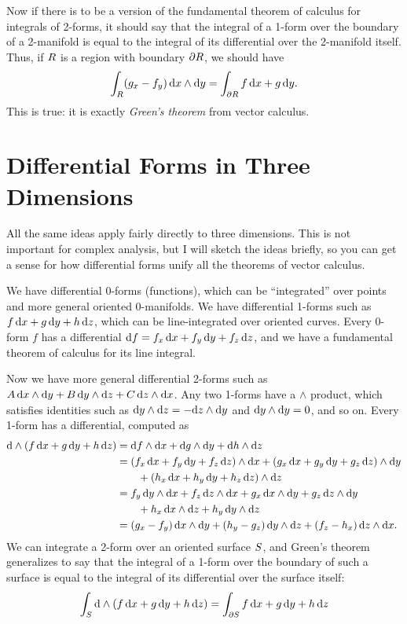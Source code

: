 \documentclass[12pt]{amsart}
\begin{document}
Now if there is to be a version of the fundamental theorem of calculus for integrals of 2-forms, it should say that the integral of a 1-form over the boundary of a 2-manifold is equal to the integral of its differential over the 2-manifold itself.
Thus, if $R$ is a region with boundary $\partial R$, we should have
\[ \int_{R} ({g}_{x} - {f}_{y})\, {\mathrm{d} x}\wedge{\ensuremath{\mathrm{d} y}} = \int_{\partial R} f\,{\mathrm{d} x} + g\,{\mathrm{d} y}. \]
This is true: it is exactly \emph{Green's theorem} from vector calculus.

\section{Differential Forms in Three Dimensions}
\label{sec:forms-in-3D}

All the same ideas apply fairly directly to three dimensions.
This is not important for complex analysis, but I will sketch the ideas briefly, so you can get a sense for how differential forms unify all the theorems of vector calculus.

We have differential 0-forms (functions), which can be ``integrated'' over points and more general oriented 0-manifolds.
We have differential 1-forms such as $f\,{\mathrm{d} x} + g\,{\mathrm{d} y} + h\,{\mathrm{d} z}$, which can be line-integrated over oriented curves.
Every 0-form $f$ has a differential ${\mathrm{d} f} = {f}_{x} \,{\mathrm{d} x} + {f}_{y}\,{\mathrm{d} y} + {f}_{z}\,{\mathrm{d} z}$, and we have a fundamental theorem of calculus for its line integral.

Now we have more general differential 2-forms such as $A\,{\mathrm{d} x}\wedge{\ensuremath{\mathrm{d} y}} + B\,{\mathrm{d} y}\wedge{\ensuremath{\mathrm{d} z}} + C \,{\mathrm{d} z}\wedge{\ensuremath{\mathrm{d} x}}$.
Any two 1-forms have a $\wedge$ product, which satisfies identities such as ${\mathrm{d} y}\wedge{\ensuremath{\mathrm{d} z}} = -{\mathrm{d} z}\wedge{\ensuremath{\mathrm{d} y}}$ and ${\mathrm{d} y}\wedge{\ensuremath{\mathrm{d} y}}=0$, and so on.
Every 1-form has a differential, computed as
\begin{align*}
  \mathrm{d}\wedge(f\,{\mathrm{d} x} + g\,{\mathrm{d} y} + h\,{\mathrm{d} z})
  &= {\mathrm{d} f}\wedge{\ensuremath{\mathrm{d} x}} + {\mathrm{d} g}\wedge{\ensuremath{\mathrm{d} y}} + {\mathrm{d} h}\wedge{\ensuremath{\mathrm{d} z}}\\
  &= ({f}_{x} \,{\mathrm{d} x} + {f}_{y} \,{\mathrm{d} y} + {f}_{z}\,{\mathrm{d} z})\wedge{\ensuremath{\mathrm{d} x}} + ({g}_{x} \,{\mathrm{d} x} + {g}_{y} \,{\mathrm{d} y} + {g}_{z}\,{\mathrm{d} z})\wedge{\ensuremath{\mathrm{d} y}}\\
  &\qquad + ({h}_{x} \,{\mathrm{d} x} + {h}_{y} \,{\mathrm{d} y} + {h}_{z}\,{\mathrm{d} z})\wedge{\ensuremath{\mathrm{d} z}}\\
  &= {f}_{y} \,{\mathrm{d} y}\wedge{\ensuremath{\mathrm{d} x}} + {f}_{z}\,{\mathrm{d} z}\wedge{\ensuremath{\mathrm{d} x}} + {g}_{x} \,{\mathrm{d} x}\wedge{\ensuremath{\mathrm{d} y}} + {g}_{z}\,{\mathrm{d} z} \wedge{\ensuremath{\mathrm{d} y}} \\
  &\qquad + {h}_{x}\,{\mathrm{d} x}\wedge{\ensuremath{\mathrm{d} z}} + {h}_{y} \,{\mathrm{d} y}\wedge{\ensuremath{\mathrm{d} z}}\\
  &= ({g}_{x} - {f}_{y})\,{\mathrm{d} x}\wedge{\ensuremath{\mathrm{d} y}} + ({h}_{y} - {g}_{z}) \,{\mathrm{d} y}\wedge{\ensuremath{\mathrm{d} z}} + ({f}_{z} - {h}_{x})\,{\mathrm{d} z}\wedge{\ensuremath{\mathrm{d} x}}.
\end{align*}
We can integrate a 2-form over an oriented surface $S$, and Green's theorem generalizes to say that the integral of a 1-form over the boundary of such a surface is equal to the integral of its differential over the surface itself:
\begin{equation}
  \int_{S} \mathrm{d}\wedge(f\,{\mathrm{d} x} + g\,{\mathrm{d} y} + h\,{\mathrm{d} z}) = \int_{\partial S} f\,{\mathrm{d} x} + g\,{\mathrm{d} y} + h\,{\mathrm{d} z}\label{eq:stokes-theorem}
\end{equation}
\end{document}
